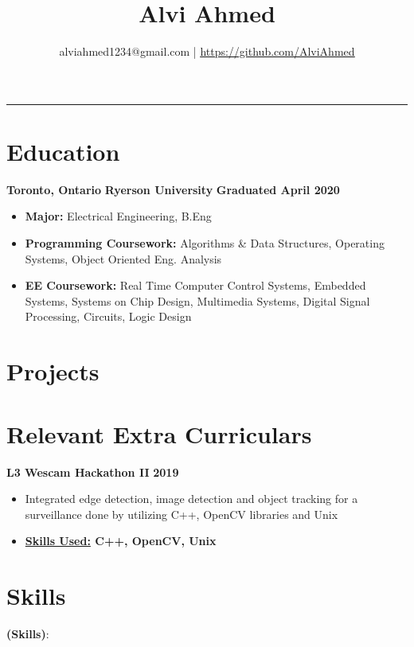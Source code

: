 \documentclass[11pt]{article}
\title{
	Alvi Ahmed
}
\author{alviahmed1234@gmail.com | \underline{\url{https://github.com/AlviAhmed}}}
\newcommand{\spaces}{1em}
\newcommand{\uniname}{Ryerson University}
\newcommand{\unigrad}{Graduated April 2020}
\newcommand{\uniloc}{Toronto, Ontario}
\newcommand{\uni}[3]{
  \begin{flushleft}
    {\small\bfseries #1}
    \hfill
    {\small\bfseries #2}
    \hfill
    {\small\bfseries #3}
\end{flushleft}
  \vspace{-0.7em}
}
\renewcommand{\maketitle}{
    \begin{center}
    \phantom{.} %
    \vspace{-2em}
    	{\Huge\bfseries \thetitle}
    	\vspace{-0.5em}
		\par\noindent\rule{\textwidth}{2pt}
	\end{center} 
	\begin{center} 
		\vspace{-1em}  
		{\small\theauthor}
	\end{center}
}
\begin{document}

\maketitle    

\section*{Education}
	\uni{\uniloc}{\uniname}{\unigrad}
	\begin{itemize}[noitemsep,nolistsep]   
		\item \textbf{Major:} Electrical Engineering, B.Eng
        \item \textbf{Programming Coursework: } Algorithms \& Data Structures,
           Operating Systems, Object Oriented Eng. Analysis 
        \item \textbf{EE Coursework: } Real Time Computer Control Systems,
          Embedded Systems, Systems on Chip Design, Multimedia Systems,
          Digital Signal Processing, Circuits, Logic Design
        \end{itemize}
        \section*{Projects}


 
        \section*{Relevant Extra Curriculars}
            \textbf{L3 Wescam Hackathon II}  \hfill \textbf{2019}
            \begin{itemize}[noitemsep,nolistsep]
              \item Integrated edge detection, image detection and object tracking for a
                surveillance done by utilizing C++, OpenCV libraries and Unix
              \item \textbf{\underline{Skills Used:} C++, OpenCV, Unix}
	            \end{itemize}
                    \vspace{\spaces}
            

          \section*{Skills}

          \vspace{\spaces}

          \textbf{(Skills)}:
          
          \vspace{\spaces}
          


			                          
\end{document}
